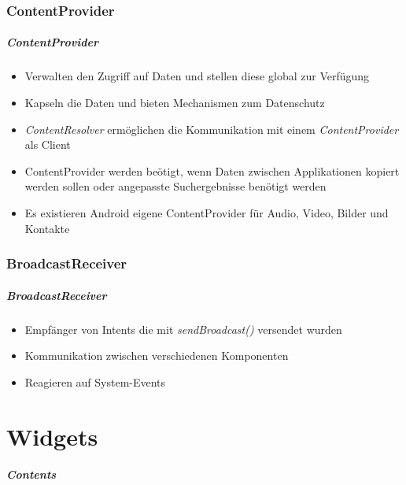 \section{ContentProvider}
\begin{frame}[label=content_provider]
   \frametitle{ContentProvider}
   \begin{itemize}
      \item Verwalten den Zugriff auf Daten und stellen diese global zur Verfügung
      \item Kapseln die Daten und bieten Mechanismen zum Datenschutz
      \item \emph{ContentResolver} ermöglichen die Kommunikation mit 
         einem \emph{ContentProvider} als Client
      \item ContentProvider werden beötigt, wenn Daten zwischen Applikationen 
         kopiert werden sollen oder angepasste Suchergebnisse benötigt werden
      \item Es existieren Android eigene ContentProvider für Audio, Video, 
         Bilder und Kontakte
   \end{itemize}
\end{frame}

\section{BroadcastReceiver}
\begin{frame}[label=broadcast_receiver]
   \frametitle{BroadcastReceiver}
   \begin{itemize}
      \item Empfänger von Intents die mit \emph{sendBroadcast()} versendet wurden
      \item Kommunikation zwischen verschiedenen Komponenten
      \item Reagieren auf System-Events
   \end{itemize}

   

   
\end{frame}

\part{Widgets}
\frame{\partpage}
\begin{frame}
	\frametitle{Contents}
	\tableofcontents[]
\end{frame}

